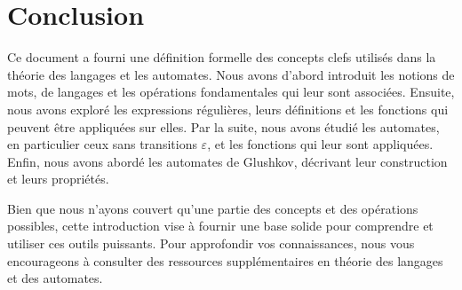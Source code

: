\section{Conclusion}

Ce document a fourni une définition formelle des concepts clefs utilisés dans
la théorie des langages et les automates. Nous avons d'abord introduit les
notions de mots, de langages et les opérations fondamentales qui leur sont
associées. Ensuite, nous avons exploré les expressions régulières, leurs
définitions et les fonctions qui peuvent être appliquées sur elles. Par la
suite, nous avons étudié les automates, en particulier ceux sans transitions
\(\varepsilon\), et les fonctions qui leur sont appliquées. Enfin, nous avons
abordé les automates de Glushkov, décrivant leur construction et leurs
propriétés.

\vphantom{}

Bien que nous n'ayons couvert qu'une partie des concepts et des opérations
possibles, cette introduction vise à fournir une base solide pour comprendre et
utiliser ces outils puissants. Pour approfondir vos connaissances, nous vous
encourageons à consulter des ressources supplémentaires en théorie des langages
et des automates.